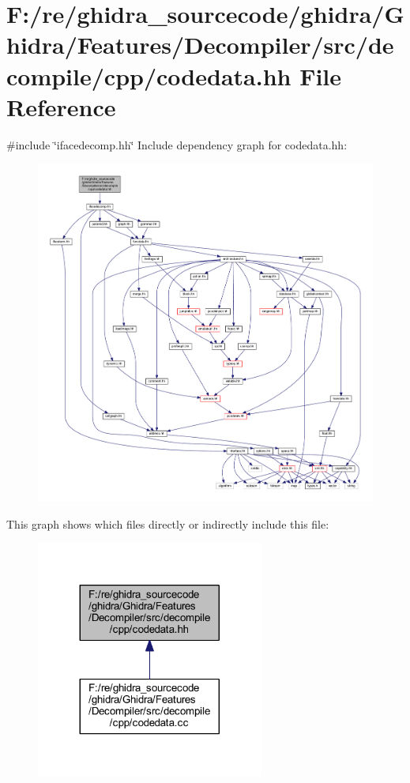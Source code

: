 \hypertarget{codedata_8hh}{}\section{F\+:/re/ghidra\+\_\+sourcecode/ghidra/\+Ghidra/\+Features/\+Decompiler/src/decompile/cpp/codedata.hh File Reference}
\label{codedata_8hh}
{\ttfamily \#include \char`\"{}ifacedecomp.\+hh\char`\"{}}\newline
Include dependency graph for codedata.\+hh\+:
\nopagebreak
\begin{figure}[H]
\begin{center}
\leavevmode
\includegraphics[width=350pt]{codedata_8hh__incl}
\end{center}
\end{figure}
This graph shows which files directly or indirectly include this file\+:
\nopagebreak
\begin{figure}[H]
\begin{center}
\leavevmode
\includegraphics[width=212pt]{codedata_8hh__dep__incl}
\end{center}
\end{figure}
